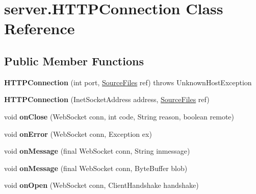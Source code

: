 \hypertarget{classserver_1_1_h_t_t_p_connection}{
\section{server.HTTPConnection Class Reference}
\label{classserver_1_1_h_t_t_p_connection}
}
\subsection*{Public Member Functions}
\begin{DoxyCompactItemize}
\item 
\hypertarget{classserver_1_1_h_t_t_p_connection_a218c536b990b37f29fb8729f2c6f2f74}{
{\bfseries HTTPConnection} (int port, \hyperlink{interfaceserver_1_1_source_files}{SourceFiles} ref)  throws UnknownHostException 	}
\label{classserver_1_1_h_t_t_p_connection_a218c536b990b37f29fb8729f2c6f2f74}

\item 
\hypertarget{classserver_1_1_h_t_t_p_connection_aa08e0cdb7f3e69715c414b64aafb7af7}{
{\bfseries HTTPConnection} (InetSocketAddress address, \hyperlink{interfaceserver_1_1_source_files}{SourceFiles} ref)}
\label{classserver_1_1_h_t_t_p_connection_aa08e0cdb7f3e69715c414b64aafb7af7}

\item 
\hypertarget{classserver_1_1_h_t_t_p_connection_a80529e03e86c57a169485f96ecf68c5d}{
void {\bfseries onClose} (WebSocket conn, int code, String reason, boolean remote)}
\label{classserver_1_1_h_t_t_p_connection_a80529e03e86c57a169485f96ecf68c5d}

\item 
\hypertarget{classserver_1_1_h_t_t_p_connection_a699cc6eb5d0a1dc647effe6e9b1b13b2}{
void {\bfseries onError} (WebSocket conn, Exception ex)}
\label{classserver_1_1_h_t_t_p_connection_a699cc6eb5d0a1dc647effe6e9b1b13b2}

\item 
\hypertarget{classserver_1_1_h_t_t_p_connection_a5ac455ab0f398241c6eb43a321652d5c}{
void {\bfseries onMessage} (final WebSocket conn, String inmessage)}
\label{classserver_1_1_h_t_t_p_connection_a5ac455ab0f398241c6eb43a321652d5c}

\item 
\hypertarget{classserver_1_1_h_t_t_p_connection_a0b2a63779c960e53a0f97967f0ac0662}{
void {\bfseries onMessage} (final WebSocket conn, ByteBuffer blob)}
\label{classserver_1_1_h_t_t_p_connection_a0b2a63779c960e53a0f97967f0ac0662}

\item 
\hypertarget{classserver_1_1_h_t_t_p_connection_a68c699873f67716b86e168fd824c15ed}{
void {\bfseries onOpen} (WebSocket conn, ClientHandshake handshake)}
\label{classserver_1_1_h_t_t_p_connection_a68c699873f67716b86e168fd824c15ed}

\end{DoxyCompactItemize}
